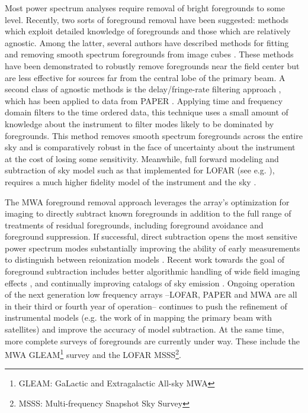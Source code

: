 \documentclass[preprint2]{aastex}
\begin{document}
Most power spectrum analyses require removal of bright foregrounds to some level.  Recently, two sorts of foreground removal have been suggested: methods which exploit detailed knowledge of foregrounds and those which are relatively agnostic. Among the latter, several authors have described methods for fitting and removing smooth spectrum foregrounds from image cubes  \cite{Morales:2006p1903,Bowman:2009p7816,Liu:2009p4762,Liu:2011p8763,Chapman:2013p10379,Dillon:2013p10497,Yatawatta:2013p9699}. These methods have been demonstrated to robustly remove foregrounds near the field center but are less effective for sources far from the central lobe of the primary beam.  A second class of agnostic methods is the delay/fringe-rate filtering approach \citep{Parsons:2012p8896,Liu:2014p10462,Liu:2014p10463}, which has been applied to data from PAPER \citep{Parsons:2014p10499}.  Applying time and frequency domain filters to the time ordered data, this technique uses a small amount of knowledge about the instrument to filter modes likely to be dominated by foregrounds.  This method removes smooth spectrum foregrounds across the entire sky and is comparatively robust in the face of uncertainty about the instrument at the cost of losing some sensitivity.  Meanwhile, full forward modeling and subtraction of sky model such as that implemented for LOFAR (see e.g. \cite{Jelic:2008p2130,Yatawatta:2013p9699}), requires a much higher fidelity model of the instrument and the sky \citep{Datta:2010p8781,Vedantham:2012p10297}.


The MWA foreground removal approach leverages the array's optimization for imaging to directly subtract known foregrounds in addition to the full range of treatments of residual foregrounds, including foreground avoidance and foreground suppression.  If successful, direct subtraction opens the most sensitive power spectrum modes substantially improving the ability of early measurements to distinguish between reionization models \citep{Beardsley:2013p9952,Pober:2014p10390}. Recent work towards the goal of foreground subtraction includes better algorithmic handling of wide field imaging effects \citep{Tasse:2012p9459,Bhatnagar..2013ApJ,Sullivan:2012p9457,Ord:2010p8442}, and continually improving catalogs of sky emission \citep{deOliveiraCosta:2008p2242,Jacobs:2011p8438,Hurley-walker:2014p45,2014AAS...22342101M}. Ongoing operation of the next generation low frequency arrays --LOFAR, PAPER and MWA are all in their  third or fourth year of operation-- continues to push the refinement of instrumental models (e.g. the work of \cite{Neben:2015pxxx} in mapping the primary beam with satellites) and improve the accuracy of model subtraction.  At the same time, more complete surveys of foregrounds are currently under way. These include the MWA GLEAM\footnote{GLEAM: GaLactic and Extragalactic All-sky MWA} survey \citep{Wayth:2015arXiv150506041W}  and the LOFAR MSSS\footnote{MSSS: Multi-frequency Snapshot Sky Survey}.   
\end{document}
